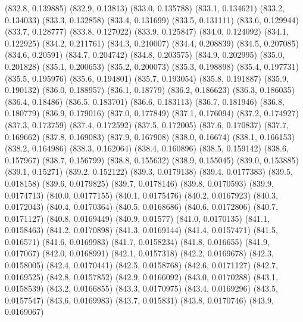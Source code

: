 {					(832.8, 0.139885)
					(832.9, 0.13813)
					(833.0, 0.135788)
					(833.1, 0.134621)
					(833.2, 0.134033)
					(833.3, 0.132858)
					(833.4, 0.131699)
					(833.5, 0.131111)
					(833.6, 0.129944)
					(833.7, 0.128777)
					(833.8, 0.127022)
					(833.9, 0.125847)
					(834.0, 0.124092)
					(834.1, 0.122925)
					(834.2, 0.211761)
					(834.3, 0.210007)
					(834.4, 0.208839)
					(834.5, 0.207085)
					(834.6, 0.20591)
					(834.7, 0.204742)
					(834.8, 0.203575)
					(834.9, 0.202995)
					(835.0, 0.201828)
					(835.1, 0.200653)
					(835.2, 0.200073)
					(835.3, 0.198898)
					(835.4, 0.197731)
					(835.5, 0.195976)
					(835.6, 0.194801)
					(835.7, 0.193054)
					(835.8, 0.191887)
					(835.9, 0.190132)
					(836.0, 0.188957)
					(836.1, 0.18779)
					(836.2, 0.186623)
					(836.3, 0.186035)
					(836.4, 0.18486)
					(836.5, 0.183701)
					(836.6, 0.183113)
					(836.7, 0.181946)
					(836.8, 0.180779)
					(836.9, 0.179016)
					(837.0, 0.177849)
					(837.1, 0.176094)
					(837.2, 0.174927)
					(837.3, 0.173759)
					(837.4, 0.172592)
					(837.5, 0.172005)
					(837.6, 0.170837)
					(837.7, 0.169662)
					(837.8, 0.169083)
					(837.9, 0.167908)
					(838.0, 0.16674)
					(838.1, 0.166153)
					(838.2, 0.164986)
					(838.3, 0.162064)
					(838.4, 0.160896)
					(838.5, 0.159142)
					(838.6, 0.157967)
					(838.7, 0.156799)
					(838.8, 0.155632)
					(838.9, 0.155045)
					(839.0, 0.153885)
					(839.1, 0.15271)
					(839.2, 0.152122)
					(839.3, 0.0179138)
					(839.4, 0.0177383)
					(839.5, 0.018158)
					(839.6, 0.0179825)
					(839.7, 0.0178146)
					(839.8, 0.0170593)
					(839.9, 0.0174713)
					(840.0, 0.0177155)
					(840.1, 0.0175476)
					(840.2, 0.0167923)
					(840.3, 0.0172043)
					(840.4, 0.0170364)
					(840.5, 0.0168686)
					(840.6, 0.0172806)
					(840.7, 0.0171127)
					(840.8, 0.0169449)
					(840.9, 0.01577)
					(841.0, 0.0170135)
					(841.1, 0.0158463)
					(841.2, 0.0170898)
					(841.3, 0.0169144)
					(841.4, 0.0157471)
					(841.5, 0.016571)
					(841.6, 0.0169983)
					(841.7, 0.0158234)
					(841.8, 0.016655)
					(841.9, 0.017067)
					(842.0, 0.0168991)
					(842.1, 0.0157318)
					(842.2, 0.0169678)
					(842.3, 0.0158005)
					(842.4, 0.0170441)
					(842.5, 0.0158768)
					(842.6, 0.0171127)
					(842.7, 0.0169525)
					(842.8, 0.0157852)
					(842.9, 0.0166092)
					(843.0, 0.0170288)
					(843.1, 0.0158539)
					(843.2, 0.0166855)
					(843.3, 0.0170975)
					(843.4, 0.0169296)
					(843.5, 0.0157547)
					(843.6, 0.0169983)
					(843.7, 0.015831)
					(843.8, 0.0170746)
					(843.9, 0.0169067)
}
